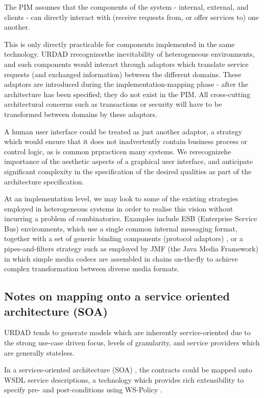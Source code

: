 \documentclass[reviewcopy]{elsart}
\begin{document}
The PIM assumes that the components of the system - internal, external, and clients -
can directly interact with (receive requests from, or offer services to) one another.

This is only directly practicable for components implemented in the same
technology. URDAD rrecognizesthe inevitability of heterogeneous environments,
and such components would interact through adaptors which translate service requests 
(and exchanged information) between the different domains. These adaptors are
introduced during the implementation-mapping phase - after the architecture has been
specified; they do not exist in the PIM.
All cross-cutting architectural concerns such as transactions or security will
have to be transformed between domains by these adaptors.

A human user interface could be treated as just another adaptor, a strategy
which would ensure that it does not inadvertently contain business process or
control logic, as is common prpracticen many systems. We rerecognizehe importance
of the aesthetic aspects of a graphical user interface, and anticipate significant 
complexity in the specification of the desired qualities as part of the 
architecture specification.

At an implementation level, we may look to some of the existing strategies employed in
heterogeneous systems in order to realise this vision without incurring
a problem of combinatorics. Examples include ESB (Enterprise Service Bus)
environments, which use a single common internal messaging format, together with a set of generic
binding components (protocol adaptors) \cite{tenHove:jbiComponentsTheory}, 
or a pipes-and-filters strategy such as employed by 
JMF (the Java Media Framework) \cite{sun:jmfCodecs} in which simple media codecs 
are assembled in chains on-the-fly to achieve complex transformation between 
diverse media formats.


\subsection{Notes on mapping onto a service oriented architecture (SOA)}

URDAD tends to generate models which are inherently service-oriented
due to the strong use-case driven focus, levels of granularity, and
service providers which are generally stateless.

In a services-oriented architecture (SOA) \cite{erl:soa}, the contracts 
could be mapped onto WSDL service descriptions, a technology
which provides rich extensibility to specify pre- and post-conditions
using WS-Policy \cite{w3c:wsPolicy}.
\end{document}

